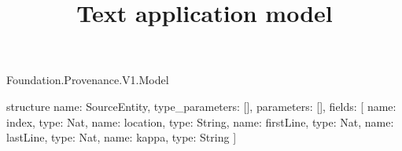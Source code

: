\begin{lexlean}{Foundation.Provenance.V1.Model}
\title{Text application model}
\begin{semanticmodule}
structure{
  name: SourceEntity,
  type_parameters: [],
  parameters: [],
  fields: [
    {name: index, type: Nat},
    {name: location, type: String},
    {name: firstLine, type: Nat},
    {name: lastLine, type: Nat},
    {name: kappa, type: String}
  ]
}
\end{semanticmodule}
\end{lexlean}
